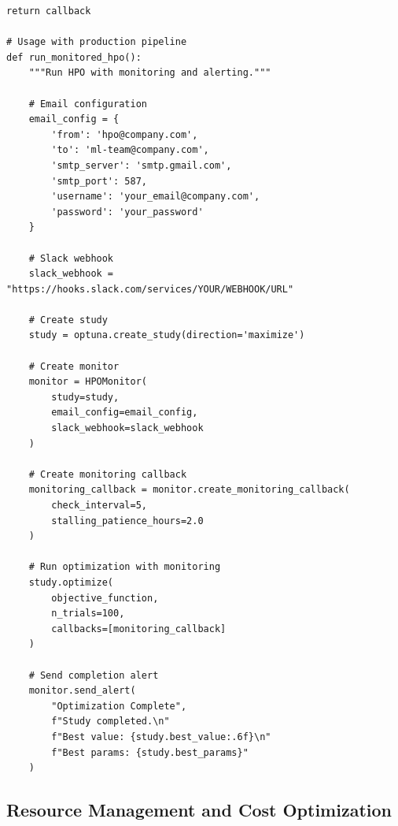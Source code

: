 \begin{lstlisting}[style=python, caption=Monitoring and alerting for production HPO]
        return callback

# Usage with production pipeline
def run_monitored_hpo():
    """Run HPO with monitoring and alerting."""

    # Email configuration
    email_config = {
        'from': 'hpo@company.com',
        'to': 'ml-team@company.com',
        'smtp_server': 'smtp.gmail.com',
        'smtp_port': 587,
        'username': 'your_email@company.com',
        'password': 'your_password'
    }

    # Slack webhook
    slack_webhook = "https://hooks.slack.com/services/YOUR/WEBHOOK/URL"

    # Create study
    study = optuna.create_study(direction='maximize')

    # Create monitor
    monitor = HPOMonitor(
        study=study,
        email_config=email_config,
        slack_webhook=slack_webhook
    )

    # Create monitoring callback
    monitoring_callback = monitor.create_monitoring_callback(
        check_interval=5,
        stalling_patience_hours=2.0
    )

    # Run optimization with monitoring
    study.optimize(
        objective_function,
        n_trials=100,
        callbacks=[monitoring_callback]
    )

    # Send completion alert
    monitor.send_alert(
        "Optimization Complete",
        f"Study completed.\n"
        f"Best value: {study.best_value:.6f}\n"
        f"Best params: {study.best_params}"
    )
\end{lstlisting}

\subsection{Resource Management and Cost Optimization}

